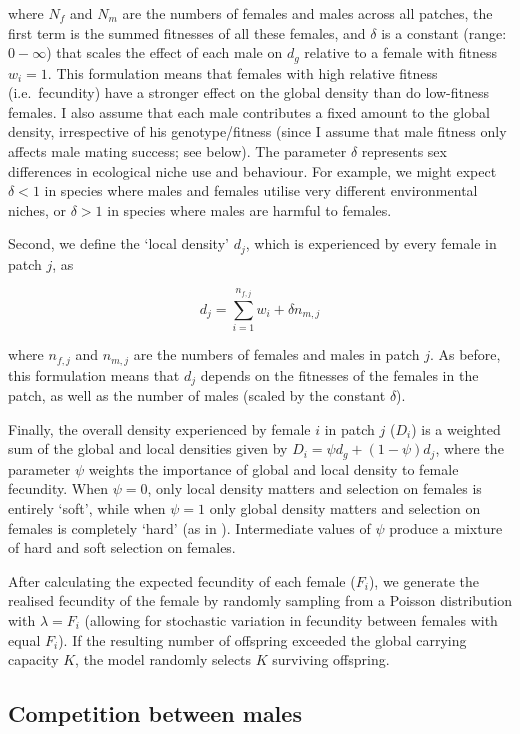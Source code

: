 \documentclass[]{rsos}%
\begin{document}
where \(N_f\) and \(N_m\) are the numbers of females and males across
all patches, the first term is the summed fitnesses of all these
females, and \(\delta\) is a constant (range: \(0-\infty\)) that scales
the effect of each male on \(d_g\) relative to a female with fitness
\(w_i = 1\). This formulation means that females with high relative
fitness (i.e.~fecundity) have a stronger effect on the global density
than do low-fitness females. I also assume that each male contributes a
fixed amount to the global density, irrespective of his genotype/fitness
(since I assume that male fitness only affects male mating success; see
below). The parameter \(\delta\) represents sex differences in
ecological niche use and behaviour. For example, we might expect
\(\delta<1\) in species where males and females utilise very different
environmental niches, or \(\delta>1\) in species where males are harmful
to females.

Second, we define the `local density' \(d_j\), which is experienced by
every female in patch \(j\), as

\[d_j = \sum_{i=1}^{n_{f,j}} w_i + \delta n_{m,j}\]

where \(n_{f,j}\) and \(n_{m,j}\) are the numbers of females and males
in patch \(j\). As before, this formulation means that \(d_j\) depends
on the fitnesses of the females in the patch, as well as the number of
males (scaled by the constant \(\delta\)).

Finally, the overall density experienced by female \(i\) in patch \(j\)
(\(D_i\)) is a weighted sum of the global and local densities given by
\(D_i = \psi d_g + (1 - \psi)d_j\), where the parameter \(\psi\) weights
the importance of global and local density to female fecundity. When
\(\psi = 0\), only local density matters and selection on females is
entirely `soft', while when \(\psi = 1\) only global density matters and
selection on females is completely `hard' (as in \citep{li2018ev}).
Intermediate values of \(\psi\) produce a mixture of hard and soft
selection on females.

After calculating the expected fecundity of each female (\(F_i\)), we
generate the realised fecundity of the female by randomly sampling from
a Poisson distribution with \(\lambda = F_i\) (allowing for stochastic
variation in fecundity between females with equal \(F_i\)). If the
resulting number of offspring exceeded the global carrying capacity
\(K\), the model randomly selects \(K\) surviving offspring.

\hypertarget{competition-between-males}{%
\subsection{Competition between males}\label{competition-between-males}}
\end{document}
